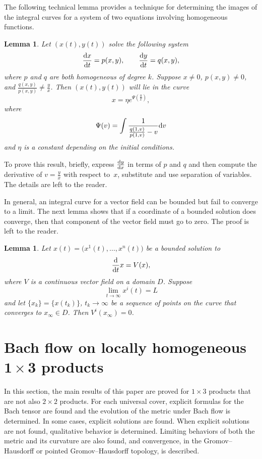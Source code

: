 \documentclass[pdftex]{sigma}
\numberwithin{equation}{section}
\newtheorem{Lemma}[Theorem]{Lemma}
\newcommand{\dtime}{\frac{{\rm d}}{{\rm d} t}} %
\begin{document}
The following technical lemma provides a technique for determining the images of the integral curves for a system of two equations involving homogeneous functions.

\begin{Lemma} \label{homogeneousodesolnlemma}
Let $(x(t), y(t))$ solve the following system
\begin{equation*}
\frac{{\rm d}x}{{\rm d}t} = p(x, y),\qquad \frac{{\rm d}y}{{\rm d}t} = q(x, y),
\end{equation*}
where $p$ and $q$ are both homogeneous of degree $k$. Suppose $x \neq 0$, $p(x,y) \neq 0$, and $\frac{q(x,y)}{p(x,y)} \neq \frac{y}{x}$. Then $(x(t), y(t))$ will lie in the curve
\[
x = \eta e^{\Psi \left(\frac{y}{x}\right)},
\]
where
\[
\Psi(v) = \int \frac{1}{\frac{q(1, v)}{p(1, v)} - v} {\rm d}v
\]
and $\eta$ is a constant depending on the initial conditions.
\end{Lemma}

To prove this result, briefly, express $\frac{{\rm d}y}{{\rm d}x}$ in terms of $p$ and $q$ and then compute the derivative of $v = \frac{y}{x}$ with respect to~$x$, substitute and use separation of variables. The details are left to the reader.

In general, an integral curve for a vector field can be bounded but fail to converge to a limit. The next lemma shows that if a coordinate of a bounded solution does converge, then that component of the vector field must go to zero. The proof is left to the reader.

\begin{Lemma} \label{odeconvergencelemma}
Let $x(t) = \big(x^1(t), \ldots, x^n(t)\big)$ be a bounded solution to
\[
\dtime x = V(x),
\]
where $V$ is a continuous vector field on a domain $D$. Suppose
\[
\lim_{t \rightarrow \infty} x^i(t) = L
\]
and let $\{x_k\} = \{x(t_k)\}$, $t_k \rightarrow \infty$ be a sequence of points on the curve that converges to $x_{\infty} \in D$. Then $V^i(x_{\infty}) = 0$.
\end{Lemma}

\section[Bach flow on locally homogeneous $1 \times 3$ products]{Bach flow on locally homogeneous $\boldsymbol{1 \times 3}$ products} \label{13flowsec}

In this section, the main results of this paper are proved for $1 \times 3$ products that are not also $2 \times 2$ products. For each universal cover, explicit formulas for the Bach tensor are found and the evolution of the metric under Bach flow is determined. In some cases, explicit solutions are found. When explicit solutions are not found, qualitative behavior is determined. Limiting behaviors of both the metric and its curvature are also found, and convergence, in the Gromov--Hausdorff or pointed Gromov--Hausdorff topology, is described.
\end{document}
